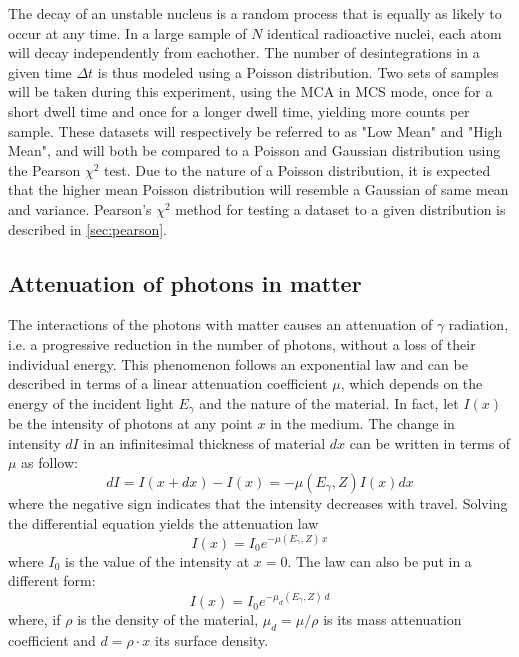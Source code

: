 The decay of an unstable nucleus is a random process that is equally as likely to occur at any time. 
In a large sample of \(N\) identical radioactive nuclei, each atom will decay independently from eachother. 
The number of desintegrations in a given time \(\Delta t\) is thus modeled 
using a Poisson distribution. Two sets of samples will be taken during this 
experiment, using the MCA in MCS mode, once for a short dwell time and once for a 
longer dwell time, yielding more counts per sample. These datasets will 
respectively be referred to as "Low Mean" and "High Mean", and will 
both be compared to a Poisson and Gaussian distribution using the Pearson 
\(\chi^2\) test. Due to the nature of a Poisson distribution, it is expected that 
the higher mean Poisson distribution will resemble a Gaussian of same mean and 
variance. Pearson's \(\chi^2\) method for testing a dataset to a given 
distribution is described in \autoref{sec:pearson}. 

\subsection{Attenuation of photons in matter}
\label{sec:attenuation}

The interactions of the photons with matter causes an attenuation of $\gamma$ radiation, i.e. a progressive reduction in the number of photons, without a loss of their individual energy.
This phenomenon follows an exponential law and can be described in terms of a linear attenuation coefficient $\mu$, which depends on the energy of the incident light $E_{\gamma}$ and the nature of the material.
In fact, let $I(x)$ be the intensity of photons at any point $x$ in the medium.
The change in intensity $dI$ in an infinitesimal thickness of material $dx$ can be written in terms of $\mu$ as follow:
\begin{equation}
    dI = I(x + dx) - I(x) = -\mu(E_{\gamma}, Z) I(x) dx
\end{equation}
where the negative sign indicates that the intensity decreases with travel.
Solving the differential equation yields the attenuation law
\begin{equation} \label{eq:attenuation_law}
    I(x) = I_0 e^{-\mu(E_{\gamma}, Z) \, x}
\end{equation}
where $I_0$ is the value of the intensity at $x=0$. 
The law can also be put in a different form:
\begin{equation} \label{eq:attenuation_law_density}
    I(x) = I_0 e^{-\mu_d(E_{\gamma}, Z) \, d}
\end{equation}
where, if $\rho$ is the density of the material, $\mu_d = \mu / \rho$ is its mass attenuation coefficient and $d = \rho \cdot x$ its surface density.

